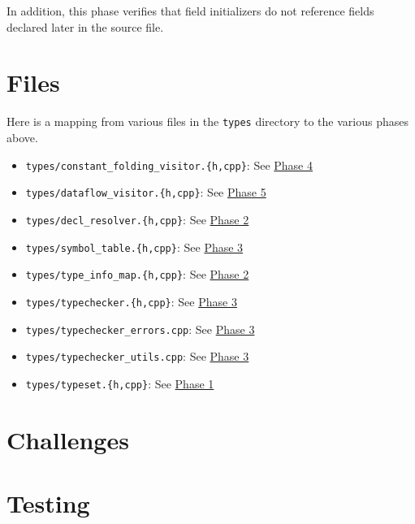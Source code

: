 \documentclass[12pt, titlepage]{article}
\newcommand{\z}[1]{\texttt{#1}}
\begin{document}
In addition, this phase verifies that field initializers do not reference
fields declared later in the source file.

\section{Files}

Here is a mapping from various files in the \z{types} directory to the various
phases above.

\begin{itemize}
  \item \z{types/constant\_folding\_visitor.\{h,cpp\}}: See \hyperref[subsubsec:const-prop]{Phase 4}
  \item \z{types/dataflow\_visitor.\{h,cpp\}}: See \hyperref[subsubsec:data-flow]{Phase 5}
  \item \z{types/decl\_resolver.\{h,cpp\}}: See \hyperref[subsubsec:fields]{Phase 2}
  \item \z{types/symbol\_table.\{h,cpp\}}: See \hyperref[subsubsec:type-checking]{Phase 3}
  \item \z{types/type\_info\_map.\{h,cpp\}}: See \hyperref[subsubsec:fields]{Phase 2}
  \item \z{types/typechecker.\{h,cpp\}}: See \hyperref[subsubsec:type-checking]{Phase 3}
  \item \z{types/typechecker\_errors.cpp}: See \hyperref[subsubsec:type-checking]{Phase 3}
  \item \z{types/typechecker\_utils.cpp}: See \hyperref[subsubsec:type-checking]{Phase 3}
  \item \z{types/typeset.\{h,cpp\}}: See \hyperref[subsubsec:col-types]{Phase 1}
\end{itemize}

\section{Challenges}

\section{Testing}
\end{document}
